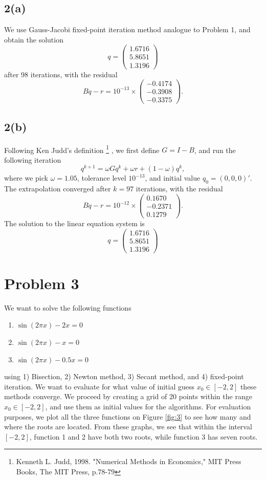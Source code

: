 \documentclass[11pt]{article}
\newcommand{\1}{\mathbbm{1}}
\newcounter{daggerfootnote}
\newcommand*{\daggerfootnote}[1]{%
	\setcounter{daggerfootnote}{\value{footnote}}%
	\renewcommand*{\thefootnote}{\fnsymbol{footnote}}%
	\footnote[2]{#1}%
	\setcounter{footnote}{\value{daggerfootnote}}%
	\renewcommand*{\thefootnote}{\arabic{footnote}}%
}
\begin{document}
\subsection*{2(a)}
We use Gauss-Jacobi fixed-point iteration method analogue to Problem 1, and obtain
the solution
\[
q=\begin{pmatrix}
	1.6716\\
	5.8651\\
	1.3196
\end{pmatrix}
\]
after 98 iterations, with the residual 
\[Bq-r =  10^{-13} \times
\begin{pmatrix}
   -0.4174\\
-0.3908\\
-0.3375
\end{pmatrix}.\] 
\subsection*{2(b)}
Following Ken Judd's definition\daggerfootnote{Kenneth L. Judd, 1998. "Numerical Methods in Economics," MIT Press Books, The MIT Press, p.78-79}, we first define $G=I-B$, and run the following iteration
\[q^{k+1}=\omega G q^k +\omega r + (1-\omega)q^k,\] 
where we pick $\omega=1.05$, tolerance level $10^{-13}$, and initial value $q_0=(0,0,0)'$. The extrapolation converged after $k=97$ iterations, with the residual 
\[Bq-r =  10^{-12} \times
\begin{pmatrix}
0.1670\\
-0.2371\\
0.1279
\end{pmatrix}.\] 
The solution to the linear equation system is
\[
q=\begin{pmatrix}
	1.6716\\
	5.8651\\
	1.3196
\end{pmatrix}
\]
\section*{Problem 3}
We want to solve the following functions 
\begin{enumerate}
	\item $\sin(2\pi x)-2x=0$
	\item $\sin(2\pi x)-x=0$
	\item $\sin(2\pi x)-0.5x=0$
\end{enumerate}
using 1) Bisection, 2) Newton method, 3) Secant method, and 4) fixed-point iteration. We want to evaluate for what value of initial guess $x_0\in[-2,2]$ these methods converge. We proceed by creating a grid of 20 points within the range $x_0\in[-2,2]$, and use them as initial values for the algorithms. For evaluation purposes, we plot all the three functions on Figure \ref{fig:3} to see how many and where the roots are located. From these graphs, we see that within the interval $[-2,2]$, function 1 and 2 have both two roots, while function 3 has seven roots.
\end{document}
